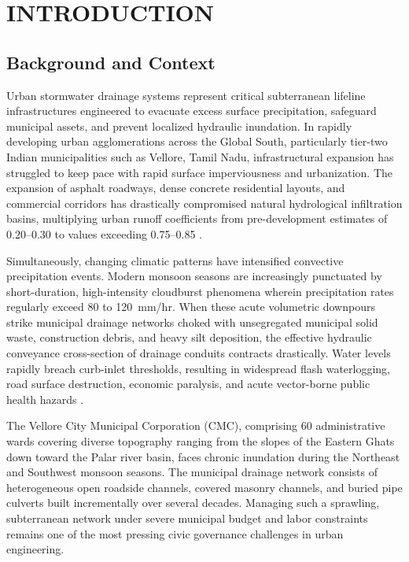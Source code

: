\documentclass[12pt,a4paper]{report}
\begin{document}
\clearpage



\clearpage
{}
\setcounter{page}{1}

\chapter{INTRODUCTION}

\section{Background and Context}
Urban stormwater drainage systems represent critical subterranean lifeline infrastructures engineered to evacuate excess surface precipitation, safeguard municipal assets, and prevent localized hydraulic inundation. In rapidly developing urban agglomerations across the Global South, particularly tier-two Indian municipalities such as Vellore, Tamil Nadu, infrastructural expansion has struggled to keep pace with rapid surface imperviousness and urbanization. The expansion of asphalt roadways, dense concrete residential layouts, and commercial corridors has drastically compromised natural hydrological infiltration basins, multiplying urban runoff coefficients from pre-development estimates of 0.20--0.30 to values exceeding 0.75--0.85 \cite{butler2018urban}.

Simultaneously, changing climatic patterns have intensified convective precipitation events. Modern monsoon seasons are increasingly punctuated by short-duration, high-intensity cloudburst phenomena wherein precipitation rates regularly exceed 80 to 120~mm/hr. When these acute volumetric downpours strike municipal drainage networks choked with unsegregated municipal solid waste, construction debris, and heavy silt deposition, the effective hydraulic conveyance cross-section of drainage conduits contracts drastically. Water levels rapidly breach curb-inlet thresholds, resulting in widespread flash waterlogging, road surface destruction, economic paralysis, and acute vector-borne public health hazards \cite{chow1988applied}.

The Vellore City Municipal Corporation (CMC), comprising 60 administrative wards covering diverse topography ranging from the slopes of the Eastern Ghats down toward the Palar river basin, faces chronic inundation during the Northeast and Southwest monsoon seasons. The municipal drainage network consists of heterogeneous open roadside channels, covered masonry channels, and buried pipe culverts built incrementally over several decades. Managing such a sprawling, subterranean network under severe municipal budget and labor constraints remains one of the most pressing civic governance challenges in urban engineering.
\end{document}
